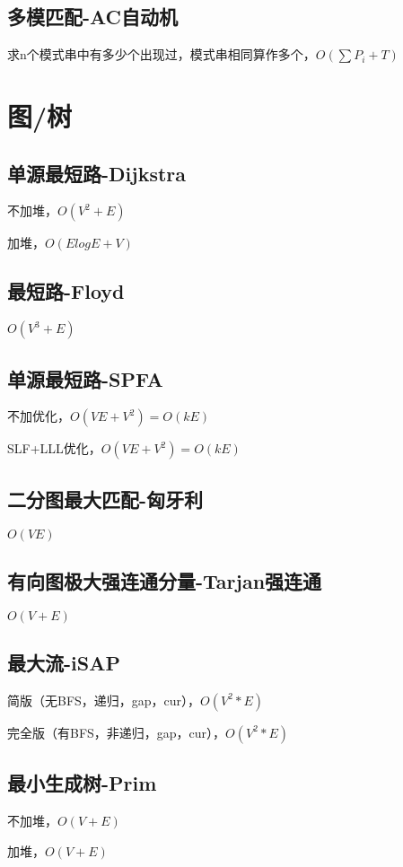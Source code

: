 \documentclass[10pt]{article}
\begin{document}
\subsection{多模匹配-AC自动机}
求n个模式串中有多少个出现过，模式串相同算作多个，$O(\sum P_i+T)$

\section{图/树}
\subsection{单源最短路-Dijkstra}
不加堆，$O(V^2+E)$

加堆，$O(ElogE+V)$


\subsection{最短路-Floyd}
$O(V^3+E)$


\subsection{单源最短路-SPFA}
不加优化，$O(VE+V^2)=O(kE)$

SLF+LLL优化，$O(VE+V^2)=O(kE)$


\subsection{二分图最大匹配-匈牙利}
$O(VE)$


\subsection{有向图极大强连通分量-Tarjan强连通}
$O(V+E)$


\subsection{最大流-iSAP}
简版（无BFS，递归，gap，cur），$O(V^2*E)$

完全版（有BFS，非递归，gap，cur），$O(V^2*E)$


\subsection{最小生成树-Prim}
不加堆，$O(V+E)$

加堆，$O(V+E)$

\end{document}
